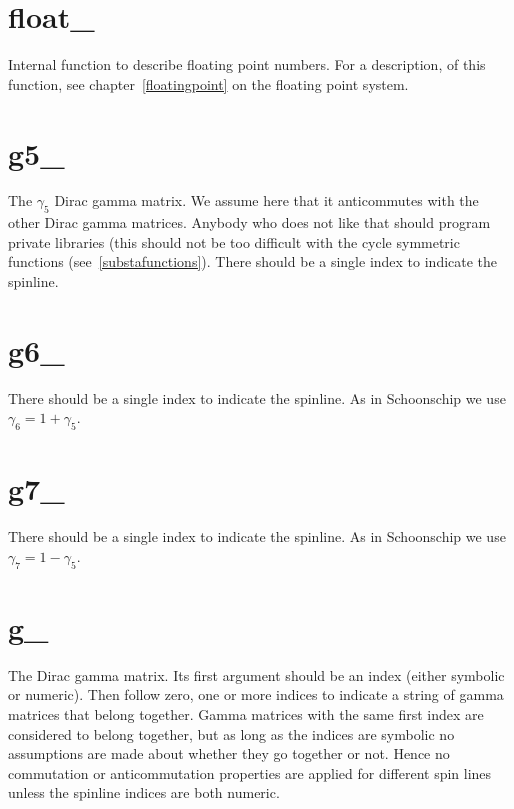 \section{float\_}
\label{funfloat}
\noindent Internal function to describe floating point numbers. 
For a description, of this function, see chapter~\ref{floatingpoint} 
on the floating point system.


\section{g5\_}
\label{fungfive}
\noindent The $\gamma_5$ Dirac gamma matrix. We assume here that it 
anticommutes with the other Dirac gamma 
matrices. Anybody who does not like that should program private libraries 
(this should not be too difficult with the cycle symmetric functions 
(see~\ref{substafunctions}). There should be a single index to indicate 
the spinline.


\section{g6\_}
\label{fungsix}
\noindent There should be a single index to indicate the spinline. 
As in Schoonschip we use $\gamma_6 = 1+\gamma_5$.


\section{g7\_}
\label{fungseven}
\noindent There should be a single index to indicate the spinline. 
As in Schoonschip we use $\gamma_7 = 1-\gamma_5$.


\section{g\_}
\label{fung}
\noindent The Dirac gamma matrix. Its 
first argument should be an index (either symbolic or numeric). Then follow 
zero, one or more indices to indicate a string of gamma matrices that 
belong together. Gamma matrices with the same first index are considered to 
belong together, but as long as the indices are symbolic no assumptions are 
made about whether they go together or not. Hence no commutation or 
anticommutation properties are applied for different spin lines unless the 
spinline indices are both numeric.

